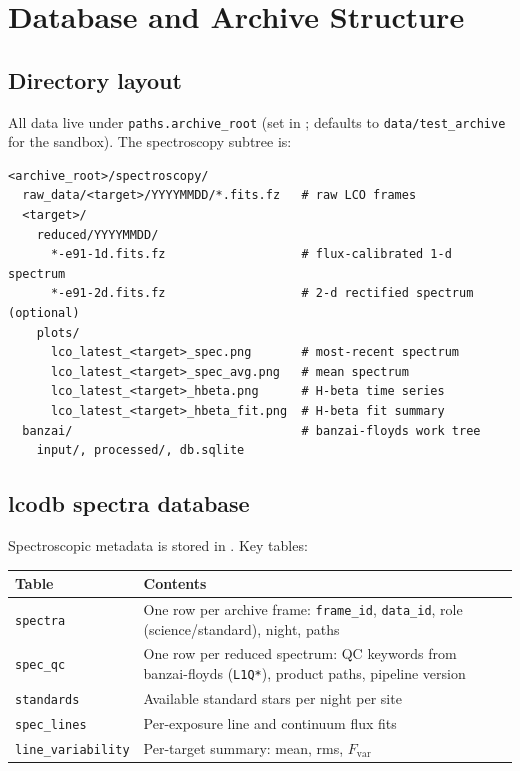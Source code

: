 \documentclass[a4paper,12pt]{article}
\begin{document}
\section{Database and Archive Structure}
\label{sec:database}

\subsection{Directory layout}

All data live under \texttt{paths.archive\_root} (set in
; defaults to \texttt{data/test\_archive}
for the sandbox).  The spectroscopy subtree is:

\begin{lstlisting}[style=shell]
<archive_root>/spectroscopy/
  raw_data/<target>/YYYYMMDD/*.fits.fz   # raw LCO frames
  <target>/
    reduced/YYYYMMDD/
      *-e91-1d.fits.fz                   # flux-calibrated 1-d spectrum
      *-e91-2d.fits.fz                   # 2-d rectified spectrum (optional)
    plots/
      lco_latest_<target>_spec.png       # most-recent spectrum
      lco_latest_<target>_spec_avg.png   # mean spectrum
      lco_latest_<target>_hbeta.png      # H-beta time series
      lco_latest_<target>_hbeta_fit.png  # H-beta fit summary
  banzai/                                # banzai-floyds work tree
    input/, processed/, db.sqlite
\end{lstlisting}

\subsection{lcodb spectra database}

Spectroscopic metadata is stored in .
Key tables:

\begin{center}
\small
\begin{tabular}{lp{9cm}}
\toprule
Table & Contents \\
\midrule
\texttt{spectra} & One row per archive frame: \texttt{frame\_id},
  \texttt{data\_id}, role (science/standard), night, paths \\
\texttt{spec\_qc} & One row per reduced spectrum: QC keywords from
  banzai-floyds (\texttt{L1Q*}), product paths, pipeline version \\
\texttt{standards} & Available standard stars per night per site \\
\texttt{spec\_lines} & Per-exposure line and continuum flux fits \\
\texttt{line\_variability} & Per-target summary: mean, rms, $F_\mathrm{var}$ \\
\bottomrule
\end{tabular}
\end{center}
\end{document}
